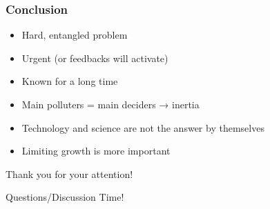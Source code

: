 \documentclass[10pt]{beamer}
\begin{document}
\begin{frame}
  \frametitle{Conclusion}
  \begin{itemize}[<+->]
  \item Hard, entangled problem
  \item Urgent (or feedbacks will activate)
  \item Known for a long time
  \item Main polluters = main deciders → inertia
  \item Technology and science are not the answer by themselves
  \item Limiting growth is more important
  \end{itemize}
\end{frame}

\begin{frame}[standout]
  Thank you for your attention!
\end{frame}

\begin{frame}[standout]
  Questions/Discussion Time!
\end{frame}
\end{document}
